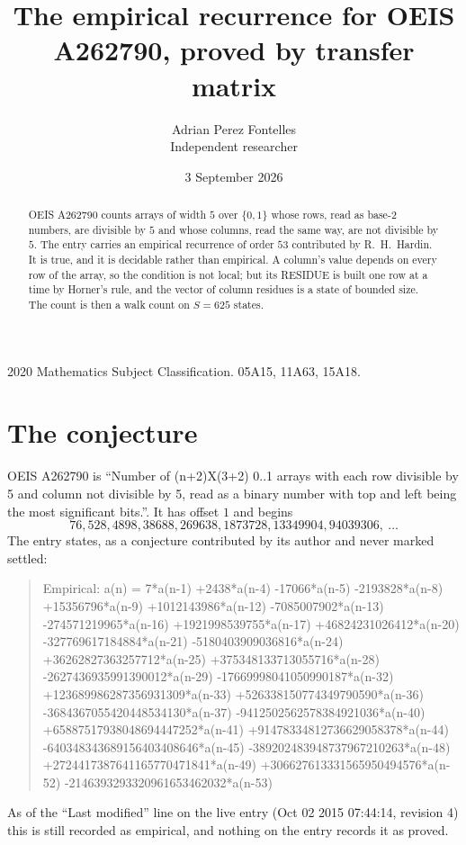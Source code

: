 \documentclass[11pt,a4paper]{article}
\title{The empirical recurrence for OEIS A262790, proved by transfer matrix}
\author{Adrian Perez Fontelles\\ \small Independent researcher}
\date{3 September 2026}
\theoremstyle{plain}
\theoremstyle{definition}
\begin{document}
\maketitle

\begin{abstract}
OEIS A262790 counts arrays of width $5$ over $\{0,1\}$ whose rows, read as base-$2$
numbers, are divisible by $5$ and whose columns, read the same way, are not divisible by
$5$. The entry carries an empirical recurrence of order $53$ contributed by
R.~H.~Hardin. It is true, and it is decidable rather than empirical. A column's value depends on
every row of the array, so the condition is not local; but its RESIDUE is built one row at a
time by Horner's rule, and the vector of column residues is a state of bounded size. The count
is then a walk count on $S=625$ states.
\end{abstract}

\noindent\small 2020 Mathematics Subject Classification. 05A15, 11A63, 15A18.\normalsize

\section{The conjecture}

OEIS A262790 is ``Number of (n+2)X(3+2) 0..1 arrays with each row divisible by 5 and column not divisible by 5, read as a binary number with top and left being the most significant bits.''. It has offset $1$ and begins
\[
76, 528, 4898, 38688, 269638, 1873728, 13349904, 94039306,\ \dots
\]
The entry states, as a conjecture contributed by its author and never marked settled:
\begin{quote}
Empirical: a(n) = 7*a(n-1) +2438*a(n-4) -17066*a(n-5) -2193828*a(n-8) +15356796*a(n-9) +1012143986*a(n-12) -7085007902*a(n-13) -274571219965*a(n-16) +1921998539755*a(n-17) +46824231026412*a(n-20) -327769617184884*a(n-21) -5180403909036816*a(n-24) +36262827363257712*a(n-25) +375348133713055716*a(n-28) -2627436935991390012*a(n-29) -17669998041050990187*a(n-32) +123689986287356931309*a(n-33) +526338150774349790590*a(n-36) -3684367055420448534130*a(n-37) -9412502562578384921036*a(n-40) +65887517938048694447252*a(n-41) +91478334812736629058378*a(n-44) -640348343689156403408646*a(n-45) -389202483948737967210263*a(n-48) +2724417387641165770471841*a(n-49) +306627613331565950494576*a(n-52) -2146393293320961653462032*a(n-53)
\end{quote}
As of the ``Last modified'' line on the live entry (Oct 02 2015 07:44:14, revision 4) this is still
recorded as empirical, and nothing on the entry records it as proved.
\end{document}
